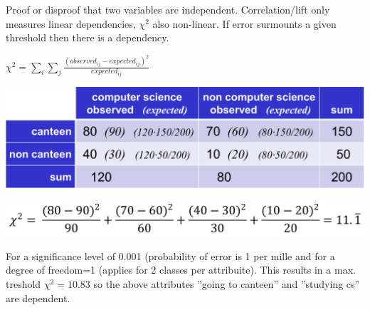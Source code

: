 \begin{breakbox}

Proof or disproof that two variables are independent. Correlation/lift only measures linear dependencies, $\chi ^2$ also non-linear. If error surmounts a given threshold then there is a dependency.
\begin{center}
	$\chi ^2 = \sum_{i}{} \sum_{j}{} \frac{(observed_{ij} - expected_{ij})^2}{expected_{ij}}$
\end{center}

\begin{center}
	\includegraphics[width=.15\textwidth]{slides_images/chi_squared_test_example}
\end{center}

\begin{center}
	\includegraphics[width=.15\textwidth]{slides_images/chi_squared_test_canteen_numbers}
\end{center}

For a significance level of 0.001 (probability of error is 1 per mille and for a degree of freedom=1 (applies for 2 classes per attribuite). This results in a max. treshold $\chi^2 = 10.83$ so the above attributes ''going to canteen'' and ''studying cs'' are dependent.
\end{breakbox}

